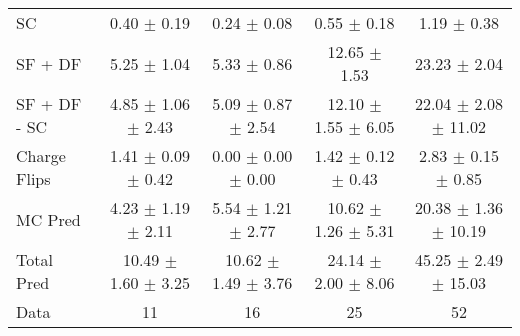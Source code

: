 \begin{tabular}{l|cccc}
                                 SC &  0.40 $\pm$  0.19 &  0.24 $\pm$  0.08 &  0.55 $\pm$  0.18 &  1.19 $\pm$  0.38 \\
                            SF + DF &  5.25 $\pm$  1.04 &  5.33 $\pm$  0.86 & 12.65 $\pm$  1.53 & 23.23 $\pm$  2.04 \\
\hline
                       SF + DF - SC &  4.85 $\pm$  1.06 $\pm$  2.43 &  5.09 $\pm$  0.87 $\pm$  2.54 & 12.10 $\pm$  1.55 $\pm$  6.05 & 22.04 $\pm$  2.08 $\pm$ 11.02 \\
\hline\hline
                       Charge Flips &  1.41 $\pm$  0.09 $\pm$  0.42 &  0.00 $\pm$  0.00 $\pm$  0.00 &  1.42 $\pm$  0.12 $\pm$  0.43 &  2.83 $\pm$  0.15 $\pm$  0.85 \\
\hline
                            MC Pred &  4.23 $\pm$  1.19 $\pm$  2.11 &  5.54 $\pm$  1.21 $\pm$  2.77 & 10.62 $\pm$  1.26 $\pm$  5.31 & 20.38 $\pm$  1.36 $\pm$ 10.19 \\
\hline
                         Total Pred & 10.49 $\pm$  1.60 $\pm$  3.25 & 10.62 $\pm$  1.49 $\pm$  3.76 & 24.14 $\pm$  2.00 $\pm$  8.06 & 45.25 $\pm$  2.49 $\pm$ 15.03 \\
\hline\hline
                               Data &    11 &    16 &    25 &    52 \\
\hline\hline
\end{tabular}

